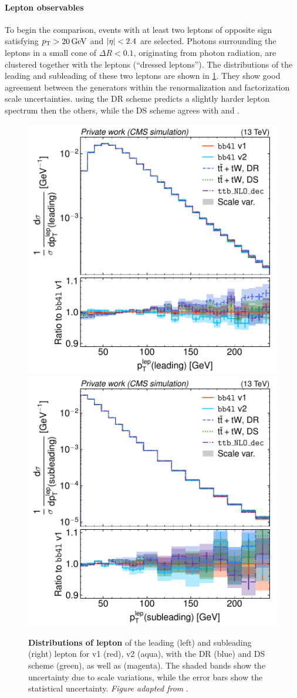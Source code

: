 \paragraph{Lepton observables} To begin the comparison, events with at least two leptons of opposite sign satisfying $\pt > \SI{20}{\GeV}$ and $|\eta| < 2.4$ are selected. Photons surrounding the leptons in a small cone of $\Delta R < 0.1$, originating from photon radiation, are clustered together with the leptons (``dressed leptons''). The \pt distributions of the leading and subleading of these two leptons are shown in \cref{fig:bb4l:leppt}. They show good agreement between the generators within the renormalization and factorization scale uncertainties. \tttWsum using the DR scheme predicts a slightly harder lepton spectrum then the others, while the DS scheme agrees with \bbfourl and \ttb.

\begin{figure}[tp]
    \centering
    \includegraphics[width=0.49 \textwidth]{figures/bb4l/generators/MC_TTBAR_DILEP_SPINDENSITY_lep_pt_1.pdf}
    \hfill
    \includegraphics[width=0.49 \textwidth]{figures/bb4l/generators/MC_TTBAR_DILEP_SPINDENSITY_lep_pt_2.pdf}
    \caption{\textbf{Distributions of lepton \pt} of the leading (left) and subleading
      (right) lepton for
      \bbfourl v1 (red), v2 (aqua), \tttWsum with the DR (blue) and DS scheme
      (green), as well as \ttb (magenta). The shaded bands show the
      uncertainty due to scale variations, while the error bars show
      the statistical uncertainty. \textit{Figure adapted from }.}
    \label{fig:bb4l:leppt}
\end{figure}


